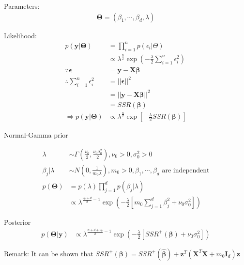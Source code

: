   Parameters:
  \begin{align*}
      \mathbf{\Theta} = (\beta_1, \cdots, \beta_d,
      \lambda)
  \end{align*}

  Likelihood:
  \begin{align*}
      p(\mathbf{y}|\mathbf{\Theta})
      &= \prod_{i=1}^n p(\epsilon_i |\Theta)\\
      &\propto \lambda^{\frac{n}{2}}\exp\left(
          -\frac{\lambda}{2}\sum_{i=1}^n \epsilon_i^2
      \right)\\
      \because \mathbf{\epsilon}
      &= \mathbf{y} -
      \mathbf{X\beta}\\
      \therefore \sum_{i=1}^n \epsilon_i^2
      &= ||\mathbf{\epsilon}||^2\\
      &=||\mathbf{y} - \mathbf{X\beta}||^2\\
      &=SSR(\mathbf{\beta})\\
      \Rightarrow p(\mathbf{y}|\mathbf{\Theta})
      &\propto \lambda^{\frac{n}{2}}\exp\left[
          -\frac{\lambda}{2}SSR(\mathbf{\beta})
      \right]
  \end{align*}

  Normal-Gamma prior

  \begin{align*}
      \lambda &\sim \Gamma\left(
          \frac{\nu_0}{2}, \frac{\nu_0\sigma_0^2}{2}
      \right), \nu_0 > 0, \sigma_0^2 > 0\\
          \beta_j|\lambda &\sim N\left(
              0, \frac{1}{m_0\lambda}
              \right), m_0 > 0, \beta_1, \cdots, \beta_d
              \text{ are independent}\\
      p(\mathbf{\Theta})
        &= p(\lambda)\prod_{j=1}^d p(\beta_j|\lambda)\\
        &\propto \lambda^{\frac{\nu_0+d}{2} - 1}
        \exp\left(
            -\frac{\lambda}{2}\left[
                m_0 \sum_{j=1}^d \beta_j^2 + \nu_0\sigma_0^2
            \right]
        \right)
  \end{align*}
  
  Posterior
  \begin{align*}
      p(\mathbf{\Theta}|\mathbf{y})
      &\propto \lambda^{\frac{n+d+\nu_0}{2} - 1}
      \exp\left(
          -\frac{\lambda}{2}\left[
              SSR^+(\mathbf{\beta}) + \nu_0\sigma_0^2
          \right]
      \right)
  \end{align*}

  Remark: It can be shown that
  $SSR^+(\mathbf{\beta})=SSR^+(\mathbf{\hat{\beta}})
  +\mathbf{z}^T(\mathbf{X}^T\mathbf{X}+m_0\mathbf{I}_d)\mathbf{z}$

